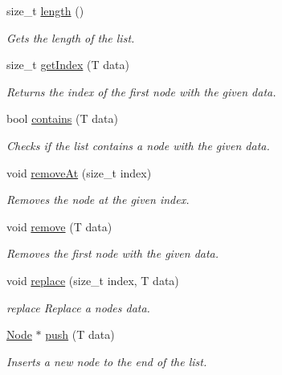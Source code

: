 \begin{DoxyCompactItemize}
size\+\_\+t \hyperlink{classLinkedList_a4b766729a31801b6fafdb6170646d318}{length} ()
\begin{DoxyCompactList}\small\item\em Gets the length of the list. \end{DoxyCompactList}\item 
size\+\_\+t \hyperlink{classLinkedList_ac274901e769cff00d61b52844e96b21e}{get\+Index} (T data)
\begin{DoxyCompactList}\small\item\em Returns the index of the first node with the given data. \end{DoxyCompactList}\item 
bool \hyperlink{classLinkedList_a603e1c5a0a4528d82f83b9393f83bf22}{contains} (T data)
\begin{DoxyCompactList}\small\item\em Checks if the list contains a node with the given data. \end{DoxyCompactList}\item 
void \hyperlink{classLinkedList_ae19893f875003b17caf0f71d26167fd4}{remove\+At} (size\+\_\+t index)
\begin{DoxyCompactList}\small\item\em Removes the node at the given index. \end{DoxyCompactList}\item 
void \hyperlink{classLinkedList_ab9aa6e03f271785f6b488d8c4cc3f3c7}{remove} (T data)
\begin{DoxyCompactList}\small\item\em Removes the first node with the given data. \end{DoxyCompactList}\item 
void \hyperlink{classLinkedList_a0a7ce2592ff7566349f68a1cb60bf00b}{replace} (size\+\_\+t index, T data)
\begin{DoxyCompactList}\small\item\em replace Replace a node\textquotesingle{}s data. \end{DoxyCompactList}\item 
\hyperlink{structLinkedList_1_1Node}{Node} $\ast$ \hyperlink{classLinkedList_a3a1e6c2009b611fb4416574178b316a3}{push} (T data)
\begin{DoxyCompactList}\small\item\em Inserts a new node to the end of the list. \end{DoxyCompactList}\item 
\mbox{\label{classLinkedList_a691b27f81c60be3c891fe6d56a4718b4}} 

\end{DoxyCompactItemize}
